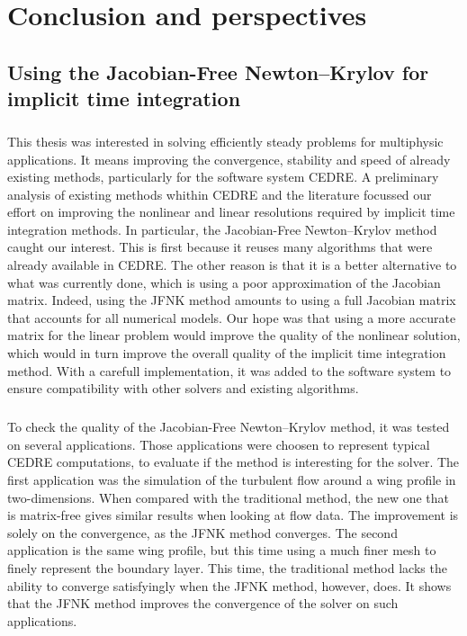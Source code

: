 \chapter*{Conclusion and perspectives}

  \section*{Using the Jacobian-Free Newton--Krylov for implicit time integration}

    \paragraph{}
    This thesis was interested in solving efficiently steady problems for multiphysic applications.
    It means improving the convergence, stability and speed of already existing methods, particularly for the software system CEDRE.
    A preliminary analysis of existing methods whithin CEDRE and the literature focussed our effort on improving the nonlinear and linear resolutions required by implicit time integration methods.
    In particular, the Jacobian-Free Newton--Krylov method caught our interest.
    This is first because it reuses many algorithms that were already available in CEDRE.
    The other reason is that it is a better alternative to what was currently done, which is using a poor approximation of the Jacobian matrix.
    Indeed, using the JFNK method amounts to using a full Jacobian matrix that accounts for all numerical models.
    Our hope was that using a more accurate matrix for the linear problem would improve the quality of the nonlinear solution, which would in turn improve the overall quality of the implicit time integration method.
    With a carefull implementation, it was added to the software system to ensure compatibility with other solvers and existing algorithms.

    \paragraph{}
    To check the quality of the Jacobian-Free Newton--Krylov method, it was tested on several applications.
    Those applications were choosen to represent typical CEDRE computations, to evaluate if the method is interesting for the solver.
    The first application was the simulation of the turbulent flow around a wing profile in two-dimensions.
    When compared with the traditional method, the new one that is matrix-free gives similar results when looking at flow data.
    The improvement is solely on the convergence, as the JFNK method converges.
    The second application is the same wing profile, but this time using a much finer mesh to finely represent the boundary layer.
    This time, the traditional method lacks the ability to converge satisfyingly when the JFNK method, however, does.
    It shows that the JFNK method improves the convergence of the solver on such applications.


